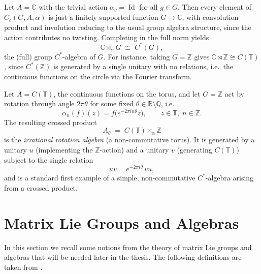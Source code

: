 \begin{example}
    \label{example:trivial-action-group-algebra}
    Let \( A = \mathbb{C} \) with the trivial action \( \alpha_g =
    \operatorname{Id} \)
    for all \( g \in G \). Then every element of \( C_c(G,A,\alpha) \) is just
    a finitely supported function \( G \to \mathbb{C} \), with convolution
    product and involution reducing to the usual group algebra structure,
    since the action contributes no twisting. Completing in the full norm
    yields
    \[
        \mathbb{C} \rtimes_\alpha G \;\cong\; C^*(G),
    \]
    the (full) group \( C^* \)-algebra of \( G \). For instance, taking
    \( G = \mathbb{Z} \) gives \( \mathbb{C} \rtimes \mathbb{Z} \cong
    C(\mathbb{T}) \),
    since \( C^*(\mathbb{Z}) \) is generated by a single unitary with no
    relations, i.e.\ the continuous functions on the circle via the
    Fourier transform.
\end{example}

\begin{example}
    \label{example:irrational-rotation-algebra}
    Let \( A = C(\mathbb{T}) \), the continuous functions on the torus,
    and let \( G = \mathbb{Z} \) act by rotation through angle
    \( 2\pi\theta \) for some fixed \( \theta \in \mathbb{R}
    \setminus \mathbb{Q} \), i.e.
    \[
        \alpha_n(f)(z) = f\big(e^{-2\pi i n \theta} z\big), \qquad z
        \in \mathbb{T},\; n \in \mathbb{Z}.
    \]
    The resulting crossed product
    \[
        A_\theta \;=\; C(\mathbb{T}) \rtimes_\alpha \mathbb{Z}
    \]
    is the \emph{irrational rotation algebra} (a non-commutative torus). It
    is generated by a unitary \( u \) (implementing the \( \mathbb{Z} \)-action)
    and a unitary \( v \) (generating \( C(\mathbb{T}) \)) subject to the
    single relation
    \[
        uv = e^{-2\pi i \theta}\, vu,
    \]
    and is a standard first example of a simple, non-commutative
    \( C^* \)-algebra arising from a crossed product.
\end{example}

\section{Matrix Lie Groups and Algebras}
\label{sec:matrix-lie-groups}

In this section we recall some notions from the theory of matrix Lie
groups and algebras that will be needed later in the thesis.
The following definitions are taken from \textcite{hall03}.

